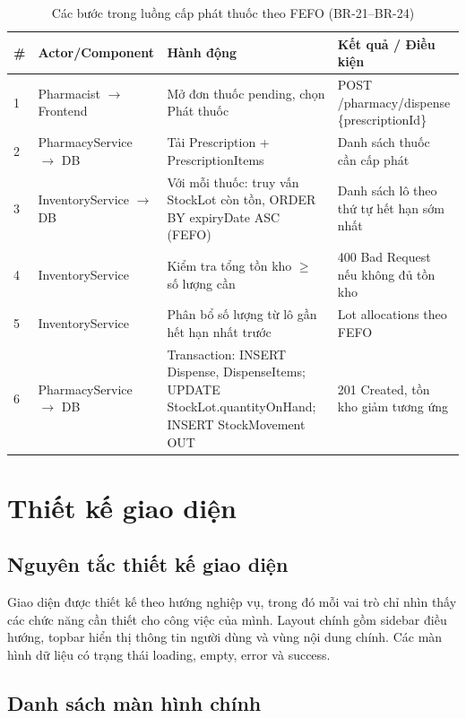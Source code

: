 \begin{longtable}{|p{0.5cm}|p{3.2cm}|p{5.5cm}|p{4.6cm}|}
\caption{Các bước trong luồng cấp phát thuốc theo FEFO (BR-21--BR-24)}\label{tab:fefo-sequence}\\
\hline
\textbf{\#} & \textbf{Actor/Component} & \textbf{Hành động} & \textbf{Kết quả / Điều kiện} \\
\hline
1 & Pharmacist $\rightarrow$ Frontend & Mở đơn thuốc pending, chọn Phát thuốc & POST /pharmacy/dispense \{prescriptionId\} \\
\hline
2 & PharmacyService $\rightarrow$ DB & Tải Prescription + PrescriptionItems & Danh sách thuốc cần cấp phát \\
\hline
3 & InventoryService $\rightarrow$ DB & Với mỗi thuốc: truy vấn StockLot còn tồn, ORDER BY expiryDate ASC (FEFO) & Danh sách lô theo thứ tự hết hạn sớm nhất \\
\hline
4 & InventoryService & Kiểm tra tổng tồn kho $\geq$ số lượng cần & 400 Bad Request nếu không đủ tồn kho \\
\hline
5 & InventoryService & Phân bổ số lượng từ lô gần hết hạn nhất trước & Lot allocations theo FEFO \\
\hline
6 & PharmacyService $\rightarrow$ DB & Transaction: INSERT Dispense, DispenseItems; UPDATE StockLot.quantityOnHand; INSERT StockMovement OUT & 201 Created, tồn kho giảm tương ứng \\
\hline
\end{longtable}

\section{Thiết kế giao diện}

\subsection{Nguyên tắc thiết kế giao diện}

Giao diện được thiết kế theo hướng nghiệp vụ, trong đó mỗi vai trò chỉ nhìn thấy các chức năng cần thiết cho công việc của mình. Layout chính gồm sidebar điều hướng, topbar hiển thị thông tin người dùng và vùng nội dung chính. Các màn hình dữ liệu có trạng thái loading, empty, error và success.

\subsection{Danh sách màn hình chính}

